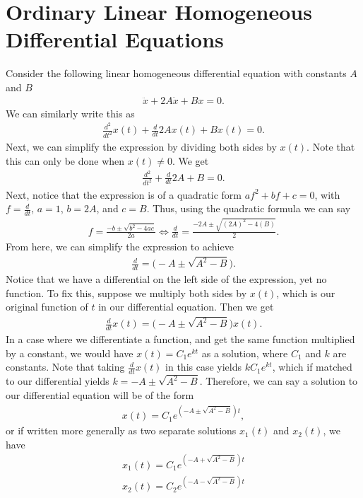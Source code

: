 \section{Ordinary Linear Homogeneous Differential Equations}

Consider the following linear homogeneous differential equation with constants $A$ and $B$
\begin{align}
\ddot{x}+2A\dot{x}+Bx=0.
\end{align}
We can similarly write this as
\begin{align}
\frac{d^2}{dt^2}x(t)+\frac{d}{dt}2Ax(t)+Bx(t)=0.
\end{align}
Next, we can simplify the expression by dividing both sides by $x(t)$. Note that this can only be done when $x(t)\neq 0$. We get
\begin{align}
\frac{d^2}{dt^2}+\frac{d}{dt}2A+B=0.
\end{align}
Next, notice that the expression is of a quadratic form $af^2+bf+c=0$, with $f=\frac{d}{dt}$, $a=1$, $b=2A$, and $c=B$. Thus, using the quadratic formula we can say
\begin{align}
f=\frac{-b\pm\sqrt{b^2-4ac}}{2a}\Longleftrightarrow \frac{d}{dt}=\frac{-2A\pm\sqrt{(2A)^2-4(B)}}{2}.
\end{align}
From here, we can simplify the expression to achieve
\begin{align}
\frac{d}{dt}=\big(-A\pm\sqrt{A^2-B}\big).
\end{align}
Notice that we have a differential on the left side of the expression, yet no function. To fix this, suppose we multiply both sides by $x(t)$, which is our original function of $t$ in our differential equation. Then we get
\begin{align}
\frac{d}{dt}x(t)=\big(-A\pm\sqrt{A^2-B}\big)x(t).
\end{align}
In a case where we differentiate a function, and get the same function multiplied by a constant, we would have $x(t)=C_1e^{kt}$ as a solution, where $C_1$ and $k$ are constants. Note that taking $\frac{d}{dt}x(t)$ in this case yields $kC_1e^{kt}$, which if matched to our differential yields $k=-A\pm\sqrt{A^2-B}$. Therefore, we can say a solution to our differential equation will be of the form
\begin{align}
x(t)=C_1e^{(-A\pm\sqrt{A^2-B})t},
\end{align}
or if written more generally as two separate solutions $x_1(t)$ and $x_2(t)$, we have
\begin{align}
x_1(t)=C_1e^{(-A+\sqrt{A^2-B})t} \\
x_2(t)=C_2e^{(-A-\sqrt{A^2-B})t}
\end{align}
